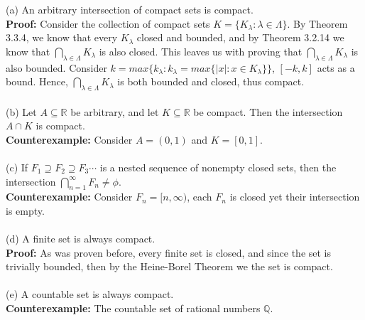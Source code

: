 \documentclass{article}
\begin{document}
\begin{itemize}
	(a) An arbitrary intersection of compact sets is compact. \\
	\textbf{Proof:} Consider the collection of compact sets $K = \{K_\lambda : \lambda \in \Lambda \}$. By Theorem 3.3.4, we know that every $K_\lambda$ closed and bounded, and by Theorem 3.2.14 we know that $\bigcap_{\lambda \in \Lambda} K_\lambda$ is also closed. This leaves us with proving that $\bigcap_{\lambda \in \Lambda} K_\lambda$ is also bounded. Consider $k = max\{k_\lambda : k_\lambda = max\{|x| : x \in K_\lambda\}\}$, $[-k, k]$ acts as a bound. Hence, $\bigcap_{\lambda \in \Lambda} K_\lambda$ is both bounded and closed, thus compact. \\ \\
	(b) Let $A \subseteq \mathbb{R}$ be arbitrary, and let $K \subseteq \mathbb{R}$ be compact. Then the intersection $A \cap K$ is compact. \\
	\textbf{Counterexample:} Consider $A = (0, 1)$ and $K = [0, 1]$. \\ \\
	(c) If $F_1 \supseteq F_2 \supseteq F_3 \cdots$ is a nested sequence of nonempty closed sets, then the intersection $\bigcap_{n = 1}^\infty F_n \neq \phi$. \\
	\textbf{Counterexample:} Consider $F_n = [n, \infty)$, each $F_n$ is closed yet their intersection is empty. \\ \\
	(d) A finite set is always compact. \\
	\textbf{Proof:} As was proven before, every finite set is closed, and since the set is trivially bounded, then by the Heine-Borel Theorem we the set is compact. \\ \\
	(e) A countable set is always compact. \\
	\textbf{Counterexample:} The countable set of rational numbers $\mathbb{Q}$. \\
\end{itemize}
\end{document}

